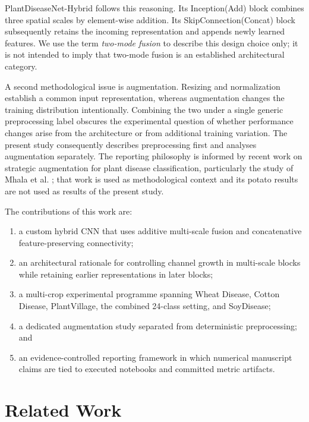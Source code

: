 \documentclass[a4paper,fleqn]{cas-dc}
\begin{document}
PlantDiseaseNet-Hybrid follows this reasoning. Its Inception(Add) block combines three spatial scales by element-wise addition. Its SkipConnection(Concat) block subsequently retains the incoming representation and appends newly learned features. We use the term \emph{two-mode fusion} to describe this design choice only; it is not intended to imply that two-mode fusion is an established architectural category.

A second methodological issue is augmentation. Resizing and normalization establish a common input representation, whereas augmentation changes the training distribution intentionally. Combining the two under a single generic preprocessing label obscures the experimental question of whether performance changes arise from the architecture or from additional training variation. The present study consequently describes preprocessing first and analyses augmentation separately. The reporting philosophy is informed by recent work on strategic augmentation for plant disease classification, particularly the study of Mhala et al. \citep{mhalap2025}; that work is used as methodological context and its potato results are not used as results of the present study.

The contributions of this work are:
\begin{enumerate}[leftmargin=*]
\item a custom hybrid CNN that uses additive multi-scale fusion and concatenative feature-preserving connectivity;
\item an architectural rationale for controlling channel growth in multi-scale blocks while retaining earlier representations in later blocks;
\item a multi-crop experimental programme spanning Wheat Disease, Cotton Disease, PlantVillage, the combined 24-class setting, and SoyDisease;
\item a dedicated augmentation study separated from deterministic preprocessing; and
\item an evidence-controlled reporting framework in which numerical manuscript claims are tied to executed notebooks and committed metric artifacts.
\end{enumerate}

\section{Related Work}
\end{document}
